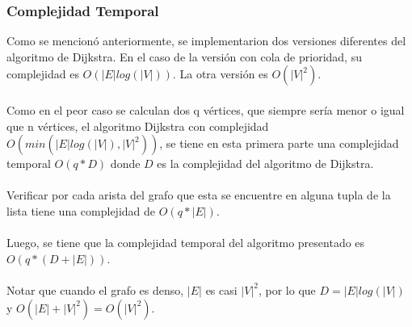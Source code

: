 \documentclass{article}
\begin{document}
\subsubsection{Complejidad Temporal}
Como se mencionó anteriormente, se implementarion dos versiones diferentes del algoritmo de Dijkstra. En el caso de la versión con cola de prioridad, su complejidad es $O(|E|log(|V|))$. La otra versión es $O(|V|^2)$.
\\
\\
Como en el peor caso se calculan dos q vértices, que siempre sería menor o igual que n vértices, el algoritmo Dijkstra con complejidad $O(min(|E|log(|V|), |V|^2))$, se tiene en esta primera parte una complejidad temporal $O(q*D)$ donde $D$ es la complejidad del algoritmo de Dijkstra.
\\
\\
Verificar por cada arista del grafo que esta se encuentre en alguna tupla de la lista tiene una complejidad de $O(q*|E|)$.
\\
\\
Luego, se tiene que la complejidad temporal del algoritmo presentado es $O(q* (D + |E|))$.
\\
\\
Notar que cuando el grafo es denso, $|E|$ es casi $|V|^2$, por lo que $D = |E|log(|V|)$ y $O(|E| + |V|^2) = O(|V|^2)$.
\end{document}
